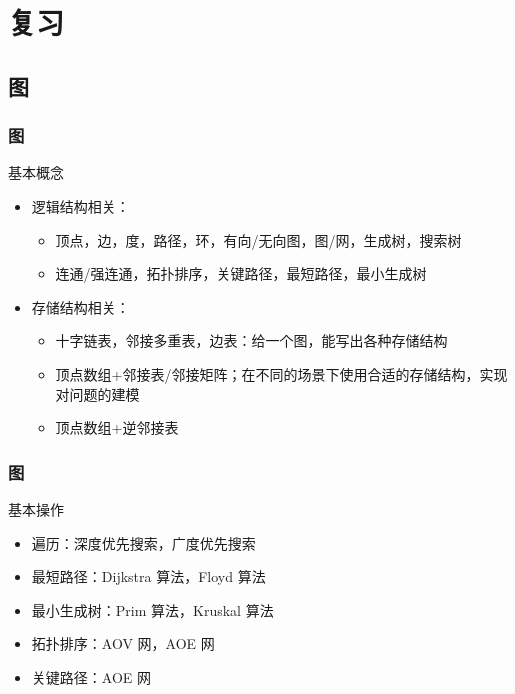 \documentclass{beamer}
\begin{document}
    \section{复习}

    \subsection{图}
    \begin{frame}
        \frametitle{图}
        \begin{block}{基本概念}
            \begin{itemize}
                \item<1-> 逻辑结构相关：
                \begin{itemize}
                    \item<2-> 顶点，边，度，路径，环，有向/无向图，图/网，生成树，搜索树
                    \item<3-> 连通/强连通，拓扑排序，关键路径，最短路径，最小生成树
                \end{itemize}
                \item<4-> 存储结构相关：
                \begin{itemize}
                    \item<5-> 十字链表，邻接多重表，边表：给一个图，能写出各种存储结构
                    \item<6-> 顶点数组+邻接表/邻接矩阵；在不同的场景下使用合适的存储结构，实现对问题的建模
                    \item<7-> 顶点数组+逆邻接表
                \end{itemize}
            \end{itemize}
        \end{block}
    \end{frame}

    \begin{frame}
        \frametitle{图}
        \begin{block}{基本操作}
            \begin{itemize}
                \item<1-> 遍历：深度优先搜索，广度优先搜索
                \item<2-> 最短路径：Dijkstra 算法，Floyd 算法
                \item<3-> 最小生成树：Prim 算法，Kruskal 算法
                \item<4-> 拓扑排序：AOV 网，AOE 网
                \item<5-> 关键路径：AOE 网
            \end{itemize}
        \end{block}
    \end{frame}
\end{document}
